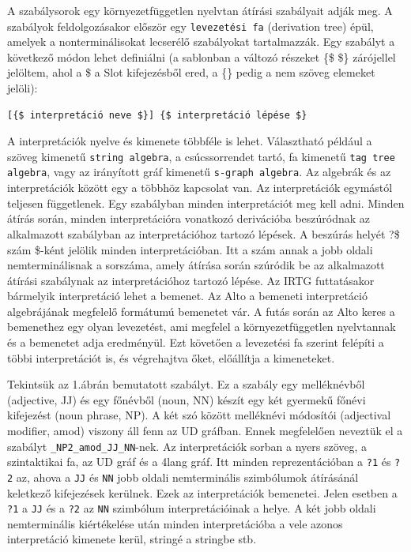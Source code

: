 A szabálysorok egy környezetfüggetlen nyelvtan átírási szabályait adják meg. A szabályok feldolgozásakor először egy \texttt{levezetési fa} (derivation tree) épül, amelyek a nonterminálisokat lecserélő szabályokat tartalmazzák. Egy szabályt a következő módon lehet definiálni (a sablonban a változó részeket \{\$ \$\} zárójellel jelöltem, ahol a \$ a Slot kifejezésből ered, a \{\} pedig a nem szöveg elemeket jelöli):
\begin{verbatim}
[{$ interpretáció neve $}] {$ interpretáció lépése $}
\end{verbatim}
A interpretációk nyelve és kimenete többféle is lehet.  Választható például a szöveg kimenetű \texttt{string algebra}, a csúcssorrendet tartó, fa kimenetű \texttt{tag tree algebra}, vagy  az irányított gráf kimenetű \texttt{s-graph algebra}. Az algebrák és az interpretációk között egy a többhöz kapcsolat van. Az interpretációk egymástól teljesen függetlenek. Egy szabályban minden interpretációt meg kell adni. Minden átírás során, minden interpretációra vonatkozó derivációba beszúródnak az alkalmazott szabályban az interpretációhoz tartozó lépések. A beszúrás helyét ?{\$ szám \$}-ként jelölik minden interpretációban. Itt a szám annak a jobb oldali nemterminálisnak a sorszáma, amely átírása során szúródik be az alkalmazott átírási szabálynak az interpretációhoz tartozó lépése. Az IRTG futtatásakor bármelyik interpretáció lehet a bemenet. Az Alto a bemeneti interpretáció algebrájának megfelelő formátumú bemenetet vár. A futás során az Alto keres a bemenethez egy olyan levezetést, ami megfelel a környezetfüggetlen nyelvtannak és a bemenetet adja eredményül. Ezt követően a levezetési fa szerint felépíti a többi interpretációt is, és végrehajtva őket, előállítja a kimeneteket.

Tekintsük az 1.ábrán bemutatott szabályt. Ez a szabály egy melléknévből (adjective, JJ) és egy főnévből (noun, NN) készít egy két gyermekű főnévi kifejezést (noun phrase, NP). A két szó között melléknévi módosítói (adjectival modifier, amod) viszony áll fenn az UD gráfban. Ennek megfelelően neveztük el a szabályt \texttt{\_NP2\_amod\_JJ\_NN}-nek. Az interpretációk sorban a nyers szöveg, a szintaktikai fa, az UD gráf és a 4lang gráf.
Itt minden reprezentációban a \texttt{?1} és \texttt{?2} az, ahova a \texttt{JJ} és \texttt{NN} jobb oldali nemterminális szimbólumok átírásánál keletkező kifejezések kerülnek. Ezek az interpretációk bemenetei. Jelen esetben a \texttt{?1} a \texttt{JJ} és a \texttt{?2} az \texttt{NN} szimbólum interpretációinak a helye. A két jobb oldali nemterminális kiértékelése után minden interpretációba a vele azonos interpretáció kimenete kerül, stringé a stringbe stb.

